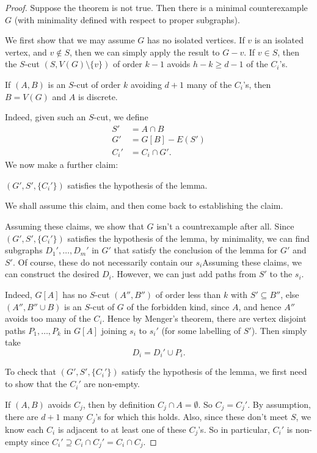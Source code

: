 \documentclass[a4paper]{article}
\begin{document}
\begin{proof}
  Suppose the theorem is not true. Then there is a minimal counterexample $G$ (with minimality defined with respect to proper subgraphs).

  We first show that we may assume $G$ has no isolated vertices. If $v$ is an isolated vertex, and $v \not \in S$, then we can simply apply the result to $G - v$. If $v \in S$, then the $S$-cut $(S, V(G) \setminus \{v\})$ of order $k - 1$ avoids $h - k \geq d - 1$ of the $C_i$'s.

  \begin{claim}
    If $(A, B)$ is an $S$-cut of order $k$ avoiding $d + 1$ many of the $C_i$'s, then $B = V(G)$ and $A$ is discrete.
  \end{claim}
  Indeed, given such an $S$-cut, we define
  \begin{align*}
    S' &= A \cap B\\
    G' &= G[B] - E(S')\\
    C_i' &= C_i \cap G'.
  \end{align*}
  We now make a further claim:
  \begin{claim}
    $(G', S', \{C_i'\})$ satisfies the hypothesis of the lemma.
  \end{claim}
  We shall assume this claim, and then come back to establishing the claim.

  Assuming these claims, we show that $G$ isn't a countrexample after all. Since $(G', S', \{C_i'\})$ satisfies the hypothesis of the lemma, by minimality, we can find subgraphs $D_1', \ldots, D_m'$ in $G'$ that satisfy the conclusion of the lemma for $G'$ and $S'$. Of course, these do not necessarily contain our $s_i$Assuming these claims, we can construct the desired $D_i$. However, we can just add paths from $S'$ to the $s_i$.

  Indeed, $G[A]$ has no $S$-cut $(A'', B'')$ of order less than $k$ with $S' \subseteq B''$, else $(A'', B'' \cup B)$ is an $S$-cut of $G$ of the forbidden kind, since $A$, and hence $A''$ avoids too many of the $C_i$. Hence by Menger's theorem, there are vertex disjoint paths $P_1, \ldots, P_k$ in $G[A]$ joining $s_i$ to $s_i'$ (for some labelling of $S'$). Then simply take
  \[
    D_i = D_i' \cup P_i.
  \]

  \separator

  To check that $(G', S', \{C_i'\})$ satisfy the hypothesis of the lemma, we first need to show that the $C_i'$ are non-empty.

  If $(A, B)$ avoids $C_j$, then by definition $C_j \cap A = \emptyset$. So $C_j = C_j'$. By assumption, there are $d + 1$ many $C_j$'s for which this holds. Also, since these don't meet $S$, we know each $C_i$ is adjacent to at least one of these $C_j$'s. So in particular, $C_i'$ is non-empty since $C_i' \supseteq C_i \cap C_j' = C_i \cap C_j$.


\end{proof}
\end{document}
